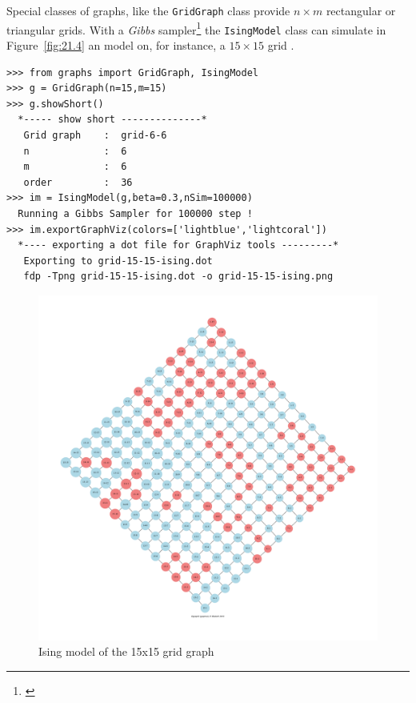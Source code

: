 Special classes of graphs, like the \texttt{GridGraph} class provide $n \times m$ rectangular or triangular grids. With a \emph{Gibbs} sampler\footnote{\citet{GEM-1984}} the \texttt{IsingModel} class can simulate in Figure~\vref{fig:21.4} an \Ising model on, for instance, a $15 \times 15$ grid \citep{ISI-1925}.
\begin{lstlisting}[caption={Simulating an Ising model on a the $15 \times 15$ rectangular grid},label=list:21.11]
>>> from graphs import GridGraph, IsingModel
>>> g = GridGraph(n=15,m=15)
>>> g.showShort()
  *----- show short --------------*
   Grid graph    :  grid-6-6
   n             :  6
   m             :  6
   order         :  36
>>> im = IsingModel(g,beta=0.3,nSim=100000)
  Running a Gibbs Sampler for 100000 step !
>>> im.exportGraphViz(colors=['lightblue','lightcoral'])
  *---- exporting a dot file for GraphViz tools ---------*
   Exporting to grid-15-15-ising.dot
   fdp -Tpng grid-15-15-ising.dot -o grid-15-15-ising.png
\end{lstlisting}
\begin{figure}[ht]
\includegraphics[width=\hsize]{Figures/21-4-grid-15-15-ising.pdf}
\caption{Ising model of the 15x15 grid graph} 
\label{fig:21.4}       %
\end{figure}

